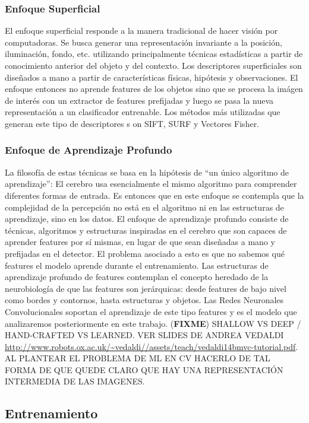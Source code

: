 \documentclass[a4paper,11pt,spanish]{book}
\newcommand*{\FIXME}[1]{{(\textbf{FIXME}) {#1}}}
\begin{document}
	\subsubsection{Enfoque Superficial}
	  El enfoque superficial responde a la manera tradicional de hacer visión por computadoras. Se busca generar una representación invariante a la posición, iluminación, fondo,
	  etc. utilizando principalmente técnicas estadísticas a partir de conocimiento anterior del objeto y del contexto. Los descriptores superficiales son diseñados a mano a 
	  partir de características físicas, hipótesis y observaciones. El enfoque entonces no aprende features de los objetos sino que se procesa la imágen de interés con un 
	  extractor de features prefijadas y luego se pasa la nueva representación a un clasificador entrenable. Los métodos más utilizadas que generan este tipo de descriptores s
	  on SIFT, SURF y Vectores Fisher.
	\subsubsection{Enfoque de Aprendizaje Profundo} 
	  La filosofía de estas técnicas se basa en la hipótesis de “un único algoritmo de aprendizaje”: El cerebro usa esencialmente el mismo algoritmo para comprender diferentes formas de entrada. 
	  Es entonces que en este enfoque se contempla que la complejidad de la percepción no está en el algoritmo ni en las estructuras de aprendizaje, sino en los datos. 
	  El enfoque de aprendizaje profundo consiste de técnicas, algoritmos y estructuras inspiradas en el cerebro que son capaces de aprender features por sí mismas, 
	  en lugar de que sean diseñadas a mano y prefijadas en el detector. El problema asociado a esto es que no sabemos qué features el modelo aprende durante el entrenamiento.
	  Las estructuras de aprendizaje profundo de features contemplan el concepto heredado de la neurobiología de que las features son jerárquicas: 
	  desde features de bajo nivel como bordes y contornos, hasta estructuras y objetos. Las Redes Neuronales Convolucionales soportan el aprendizaje de este tipo features 
	  y es el modelo que analizaremos posteriormente en este trabajo.
	 \FIXME{SHALLOW VS DEEP / HAND-CRAFTED VS LEARNED. VER SLIDES DE ANDREA VEDALDI
            \url{http://www.robots.ox.ac.uk/~vedaldi//assets/teach/vedaldi14bmvc-tutorial.pdf}.
            AL PLANTEAR EL PROBLEMA DE ML EN CV HACERLO DE TAL FORMA DE QUE QUEDE CLARO QUE HAY UNA REPRESENTACIÓN INTERMEDIA DE LAS IMAGENES.}
       
      \subsection{Entrenamiento}
\end{document}
